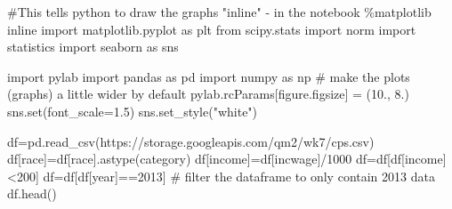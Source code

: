 \documentclass[
  letterpaper,
  DIV=11,
  numbers=noendperiod]{scrreprt}
\newenvironment{Shaded}{\begin{snugshade}}{\end{snugshade}}
\newcommand{\BuiltInTok}[1]{\textcolor[rgb]{0.00,0.23,0.31}{#1}}
\newcommand{\CommentTok}[1]{\textcolor[rgb]{0.37,0.37,0.37}{#1}}
\newcommand{\DecValTok}[1]{\textcolor[rgb]{0.68,0.00,0.00}{#1}}
\newcommand{\FloatTok}[1]{\textcolor[rgb]{0.68,0.00,0.00}{#1}}
\newcommand{\ImportTok}[1]{\textcolor[rgb]{0.00,0.46,0.62}{#1}}
\newcommand{\NormalTok}[1]{\textcolor[rgb]{0.00,0.23,0.31}{#1}}
\newcommand{\OperatorTok}[1]{\textcolor[rgb]{0.37,0.37,0.37}{#1}}
\newcommand{\StringTok}[1]{\textcolor[rgb]{0.13,0.47,0.30}{#1}}
\begin{document}
\begin{Shaded}
\begin{Highlighting}[]
\CommentTok{\#This tells python to draw the graphs "inline" {-} in the notebook}
\OperatorTok{\%}\NormalTok{matplotlib inline  }
\ImportTok{import}\NormalTok{ matplotlib.pyplot }\ImportTok{as}\NormalTok{ plt}
\ImportTok{from}\NormalTok{ scipy.stats }\ImportTok{import}\NormalTok{ norm}
\ImportTok{import}\NormalTok{ statistics}
\ImportTok{import}\NormalTok{ seaborn }\ImportTok{as}\NormalTok{ sns}

\ImportTok{import}\NormalTok{ pylab}
\ImportTok{import}\NormalTok{ pandas }\ImportTok{as}\NormalTok{ pd}
\ImportTok{import}\NormalTok{ numpy }\ImportTok{as}\NormalTok{ np}
\CommentTok{\# make the plots (graphs) a little wider by default}
\NormalTok{pylab.rcParams[}\StringTok{\textquotesingle{}figure.figsize\textquotesingle{}}\NormalTok{] }\OperatorTok{=}\NormalTok{ (}\FloatTok{10.}\NormalTok{, }\FloatTok{8.}\NormalTok{)}
\NormalTok{sns.}\BuiltInTok{set}\NormalTok{(font\_scale}\OperatorTok{=}\FloatTok{1.5}\NormalTok{)}
\NormalTok{sns.set\_style(}\StringTok{"white"}\NormalTok{)}
\end{Highlighting}
\end{Shaded}

\begin{Shaded}
\begin{Highlighting}[]
\NormalTok{df}\OperatorTok{=}\NormalTok{pd.read\_csv(}\StringTok{\textquotesingle{}https://storage.googleapis.com/qm2/wk7/cps.csv\textquotesingle{}}\NormalTok{)}
\NormalTok{df[}\StringTok{\textquotesingle{}race\textquotesingle{}}\NormalTok{]}\OperatorTok{=}\NormalTok{df[}\StringTok{\textquotesingle{}race\textquotesingle{}}\NormalTok{].astype(}\StringTok{\textquotesingle{}category\textquotesingle{}}\NormalTok{)}
\NormalTok{df[}\StringTok{\textquotesingle{}income\textquotesingle{}}\NormalTok{]}\OperatorTok{=}\NormalTok{df[}\StringTok{\textquotesingle{}incwage\textquotesingle{}}\NormalTok{]}\OperatorTok{/}\DecValTok{1000}
\NormalTok{df}\OperatorTok{=}\NormalTok{df[df[}\StringTok{\textquotesingle{}income\textquotesingle{}}\NormalTok{]}\OperatorTok{\textless{}}\DecValTok{200}\NormalTok{]}
\NormalTok{df}\OperatorTok{=}\NormalTok{df[df[}\StringTok{\textquotesingle{}year\textquotesingle{}}\NormalTok{]}\OperatorTok{==}\DecValTok{2013}\NormalTok{] }\CommentTok{\# filter the dataframe to only contain 2013 data}
\NormalTok{df.head()}
\end{Highlighting}
\end{Shaded}
\end{document}
